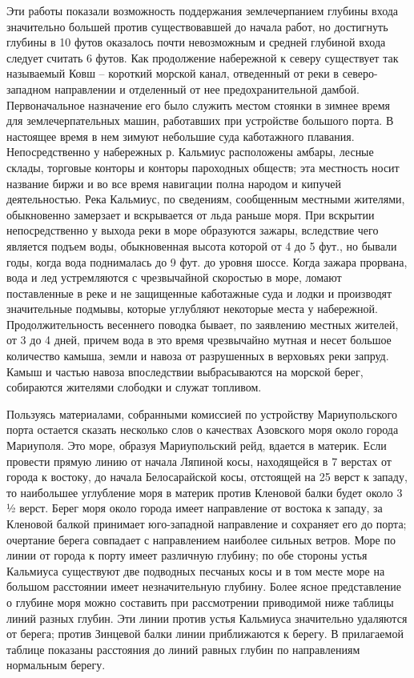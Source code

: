 Эти работы показали возможность
поддержания землечерпанием глубины входа значительно большей против
существовавшей до начала работ, но достигнуть глубины в 10 футов оказалось
почти невозможным и средней глубиной входа следует считать 6 футов. Как
продолжение набережной к северу существует так называемый Ковш – короткий
морской канал, отведенный от реки в северо-западном направлении и отделенный от
нее предохранительной дамбой. Первоначальное назначение его было служить местом
стоянки в зимнее время для землечерпательных машин, работавших при устройстве
большого порта. В настоящее время в нем   зимуют небольшие суда каботажного
плавания. Непосредственно у набережных р. Кальмиус расположены амбары, лесные
склады, торговые конторы и конторы пароходных обществ; эта местность носит
название биржи и во все время навигации полна народом и кипучей деятельностью.
Река Кальмиус, по сведениям, сообщенным местными жителями, обыкновенно
замерзает и вскрывается от льда раньше моря. При  вскрытии непосредственно у
выхода реки в море образуются зажары, вследствие чего является подъем воды,
обыкновенная высота которой от 4 до 5 фут., но бывали годы, когда вода
поднималась до 9 фут. до уровня шоссе. Когда зажара прорвана, вода и лед
устремляются с чрезвычайной скоростью в море, ломают поставленные в реке и не
защищенные каботажные суда и лодки и производят значительные подмывы, которые
углубляют некоторые места у набережной. Продолжительность весеннего поводка
бывает, по заявлению местных жителей, от 3 до 4 дней, причем вода в это время
чрезвычайно мутная и несет большое количество камыша, земли и навоза от
разрушенных в верховьях реки запруд. Камыш и частью навоза впоследствии
выбрасываются на морской берег, собираются жителями слободки и служат топливом.

Пользуясь материалами, собранными комиссией по устройству Мариупольского порта
остается сказать несколько слов о качествах Азовского моря около города
Мариуполя. Это море, образуя Мариупольский рейд, вдается в материк. Если
провести прямую линию от начала Ляпиной косы, находящейся в 7 верстах от города
к востоку, до начала Белосарайской косы, отстоящей на 25 верст к западу, то
наибольшее углубление моря в материк против Кленовой балки будет около 3 ½
верст. Берег моря около города имеет направление от востока к западу, за
Кленовой балкой принимает юго-западной направление и сохраняет его до порта;
очертание берега совпадает с направлением наиболее сильных ветров. Море по
линии от города к порту имеет различную глубину; по обе стороны устья Кальмиуса
существуют две подводных песчаных косы и в том месте море на большом расстоянии
имеет незначительную глубину. Более ясное представление о глубине моря можно
составить при рассмотрении приводимой ниже таблицы линий разных глубин. Эти
линии против устья Кальмиуса значительно удаляются от берега; против Зинцевой
балки линии приближаются к берегу. В прилагаемой таблице показаны расстояния до
линий равных глубин по направлениям нормальным берегу.

